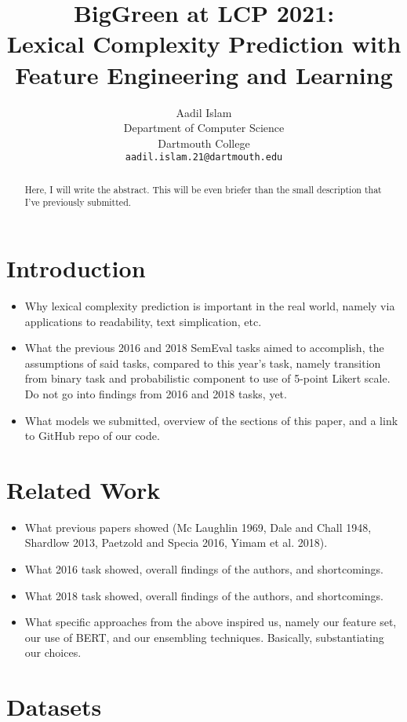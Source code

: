 \documentclass[11pt,a4paper]{article}
\title{BigGreen at LCP 2021: \\
Lexical Complexity Prediction with Feature Engineering and Learning}
\author{
  Aadil Islam\\
  Department of Computer Science\\
  Dartmouth College\\
  \texttt{aadil.islam.21@dartmouth.edu}
}
\date{}
\begin{document}
\maketitle
\begin{abstract}
  Here, I will write the abstract. This will be even briefer than the small description that I've previously submitted.
\end{abstract}

\section{Introduction}

\begin{itemize}
  \item Why lexical complexity prediction is important in the real world, namely via applications to readability, text simplication, etc.
  \item What the previous 2016 and 2018 SemEval tasks aimed to accomplish, the assumptions of said tasks, compared to this year's task, namely transition from binary task and probabilistic component to use of 5-point Likert scale. Do not go into findings from 2016 and 2018 tasks, yet.
  \item What models we submitted, overview of the sections of this paper, and a link to GitHub repo of our code.
\end{itemize}

\section{Related Work}

\begin{itemize}
  \item What previous papers showed (Mc Laughlin 1969, Dale and Chall 1948, Shardlow 2013, Paetzold and Specia 2016, Yimam et al. 2018).
  \item What 2016 task showed, overall findings of the authors, and shortcomings. 
  \item What 2018 task showed, overall findings of the authors, and shortcomings.
  \item What specific approaches from the above inspired us, namely our feature set, our use of BERT, and our ensembling techniques. Basically, substantiating our choices.
\end{itemize}

\section{Datasets}
\end{document}
